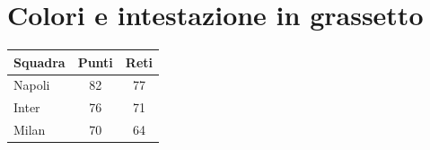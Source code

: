 \documentclass{article}
\begin{document}
\section*{Colori e intestazione in grassetto}

\begin{tabular}{lcc}
  \toprule
  \rowcolor{gray!15}
  \textbf{Squadra} & \textbf{Punti} & \textbf{Reti} \\
  \midrule
  Napoli & 82 & 77 \\
  \rowcolor{gray!8}
  Inter & 76 & 71 \\
  Milan & 70 & 64 \\
  \bottomrule
\end{tabular}
\end{document}
